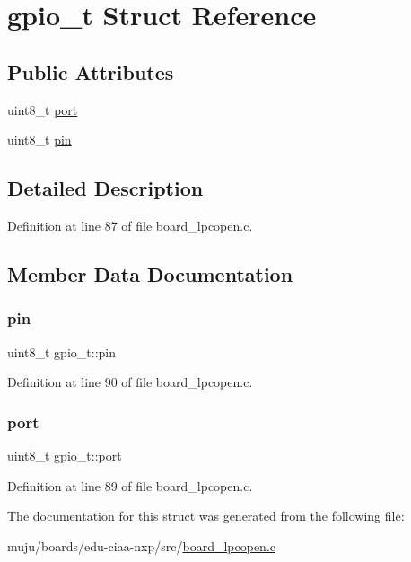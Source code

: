 \hypertarget{structgpio__t}{}\section{gpio\+\_\+t Struct Reference}
\label{structgpio__t}
\subsection*{Public Attributes}
\begin{DoxyCompactItemize}
\item 
uint8\+\_\+t \hyperlink{structgpio__t_aaeaa1254bfa0b22e0abd59b426eb007b}{port}
\item 
uint8\+\_\+t \hyperlink{structgpio__t_a2ed8155e79b479b1fdd7524f0ee7a100}{pin}
\end{DoxyCompactItemize}


\subsection{Detailed Description}


Definition at line 87 of file board\+\_\+lpcopen.\+c.



\subsection{Member Data Documentation}
\mbox{\label{structgpio__t_a2ed8155e79b479b1fdd7524f0ee7a100}} 
\subsubsection{\texorpdfstring{pin}{pin}}
{\footnotesize\ttfamily uint8\+\_\+t gpio\+\_\+t\+::pin}



Definition at line 90 of file board\+\_\+lpcopen.\+c.

\mbox{\label{structgpio__t_aaeaa1254bfa0b22e0abd59b426eb007b}} 
\subsubsection{\texorpdfstring{port}{port}}
{\footnotesize\ttfamily uint8\+\_\+t gpio\+\_\+t\+::port}



Definition at line 89 of file board\+\_\+lpcopen.\+c.



The documentation for this struct was generated from the following file\+:\begin{DoxyCompactItemize}
\item 
muju/boards/edu-\/ciaa-\/nxp/src/\hyperlink{board__lpcopen_8c}{board\+\_\+lpcopen.\+c}\end{DoxyCompactItemize}
